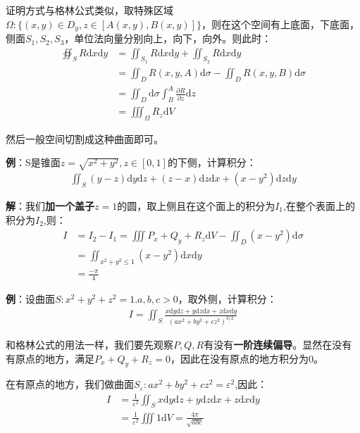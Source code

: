 \documentclass{ctexart}
\let\oldtextbf\textbf
\renewcommand{\textbf}[1]{\textcolor{brown!50!red}{\oldtextbf{#1}}}
\begin{document}
证明方式与格林公式类似，取特殊区域$\Omega:\{(x,y)\in D_y,z\in[A(x,y),B(x,y)]\}$，则在这个空间有上底面，下底面，侧面$S_1,S_2,S_3$，单位法向量分别向上，向下，向外。则此时：
\begin{align*}
   \oiint_S R\mathrm{d}x\mathrm{d}y&=\iint_{S_1}R\mathrm{d}x\mathrm{d}y+\iint_{S_2}R\mathrm{d}x\mathrm{d}y\\
&=\iint_D R(x,y,A)\mathrm{d}\sigma-\iint_D R(x,y,B)\mathrm{d}\sigma\\
&=\iint_D\mathrm{d}\sigma\int_B^A\frac{\partial R}{\partial z}\mathrm{d}z\\
&=\iiint_\Omega R_z\mathrm{d}V 
\end{align*}

然后一般空间切割成这种曲面即可。

\textbf{\color{brown!50!red}例}：S是锥面$z=\sqrt{x^2+y^2},z\in[0,1]$的下侧，计算积分：
\begin{align*} 
  \iint_S (y-z)\mathrm{d}y\mathrm{d}z+(z-x)\mathrm{d}z\mathrm{d}x+(x-y^2)\mathrm{d}z\mathrm{d}y      
\end{align*}

\textbf{\color{brown!50!red}解}：我们\textbf{\color{brown!50!red}加一个盖子}$z=1$的圆，取上侧且在这个面上的积分为$I_1$,在整个表面上的积分为$I_2$,则：
\begin{align*} 
  I&=I_2-I_1=\iiint P_x+Q_y+R_z \mathrm{d}V-\iint_D (x-y^2)\mathrm{d}\sigma\\
&=\iint_{x^2+y^2\leq 1}(x-y^2)\mathrm{d}x\mathrm{d}y \\
&=\frac{-\pi}{4} 
\end{align*}

\textbf{\color{brown!50!red}例}：设曲面$S:x^2+y^2+z^2=1.a,b,c>0$，取外侧，计算积分：
\begin{align*} I=\iint_S\frac{x\mathrm{d}y\mathrm{d}z+y\mathrm{d}z\mathrm{d}x+z\mathrm{d}x\mathrm{d}y}
{(ax^2+by^2+cz^2)^{3/2}} 
\end{align*}

和格林公式的用法一样，我们要先观察$P,Q,R$有没有\textbf{\color{brown!50!red}一阶连续偏导}。显然在没有有原点的地方，满足$P_x+Q_y+R_z=0$，因此在没有原点的地方积分为0。

在有原点的地方，我们做曲面$S_\varepsilon:ax^2+by^2+cz^2=\varepsilon^2$,因此：
\begin{align*} 
  I&=\frac{1}{\varepsilon ^2} 
\iint_Sx\mathrm{d}y\mathrm{d}z+y\mathrm{d}z\mathrm{d}x+z\mathrm{d}x\mathrm{d}y\\
&=\frac{1}{\varepsilon ^2} \iiint1\mathrm{d}V=\frac{4\pi}{\sqrt{abc} } 
\end{align*}
\end{document}
